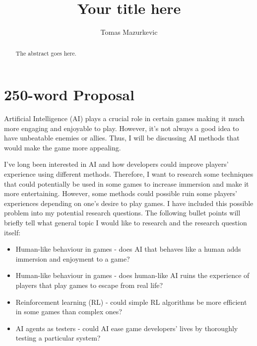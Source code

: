 \documentclass[journal]{IEEEtran}
\begin{document}
%
\title{Your title here}
%
%
\author{Tomas Mazurkevic}


\maketitle

\begin{abstract}
The abstract goes here.
\end{abstract}

\section{250-word Proposal}
Artificial Intelligence (AI) plays a crucial role in certain games making it much more engaging and enjoyable to play. However, it's not always a good idea to have unbeatable enemies or allies. Thus, I will be discussing AI methods that would make the game more appealing. 

I've long been interested in AI and how developers could improve players' experience using different methods. Therefore, I want to research some techniques that could potentially be used in some games to increase immersion and make it more entertaining. However, some methods could possible ruin some players' experiences depending on one's desire to play games. I have included this possible problem into my potential research questions. The following bullet points will briefly tell what general topic I would like to research and the research question itself:
\begin{itemize}
	\item Human-like behaviour in games - does AI that behaves like a human adds immersion and enjoyment to a game?
	\item Human-like behaviour in games - does human-like AI ruins the experience of players that play games to escape from real life?
	\item Reinforcement learning (RL) - could simple RL algorithms be more efficient in some games than complex ones?
	\item AI agents as testers - could AI ease game developers' lives by thoroughly testing a particular system?
\end{itemize}
\end{document}
